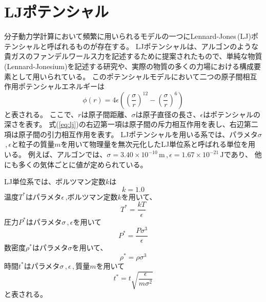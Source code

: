 \documentclass[titlepage]{jsreport}
\begin{document}
\section{LJポテンシャル}\label{principle-sec:LJ}
分子動力学計算において頻繁に用いられるモデルの一つにLennard-Jones\,(LJ)ポテンシャルと呼ばれるものが存在する。
LJポテンシャルは、アルゴンのような貴ガスのファンデルワールス力を記述するために提案された\cite{lennard-jones}もので、単純な物質(Lennard-Jonesium)を記述する研究\cite{lennard-jonesium-1,lennard-jonesium-2}や、実際の物質の多くの力場における構成要素\cite{lennard-jones-force-field-1,lennard-jones-force-field-2, lennard-jones-force-field-3}として用いられている。
このポテンシャルモデルにおいて二つの原子間相互作用ポテンシャルエネルギーは
\large
\begin{equation}
\phi(r)=4{\epsilon}\left(\left(\frac{\sigma}{r}\right)^{12}-\left(\frac{\sigma}{r}\right)^6\right)\label{eq:lj}
\end{equation}
\normalsize
と表される。
ここで、$r$は原子間距離、${\sigma}$は原子直径の長さ、${\epsilon}$はポテンシャルの深さを表す。
式(\ref{eq:lj})の右辺第一項は原子間の斥力相互作用を表し、右辺第二項は原子間の引力相互作用を表す。
LJポテンシャルを用いる系では、パラメタ$\sigma$\,,\,$\epsilon$と粒子の質量$m$を用いて物理量を無次元化したLJ単位系と呼ばれる単位を用いる。
例えば、アルゴンでは、${\sigma}=3.40×10^{-10}\,\mathrm{m}$\,,\,${\epsilon}=1.67×10^{-21}\,\mathrm{J}$であり\cite{lennard-jones-argon-parameters}、
他にも多くの気体ごとに値が定められている\cite{lennard-jones-many-parameters}。

LJ単位系では、ボルツマン定数$k$は
\large
\begin{equation}
k=1.0\label{eq:k}
\end{equation}
\normalsize
温度$T^*$はパラメタ$\epsilon$\,,ボルツマン定数$k$を用いて、
\large
\begin{equation}
T^*=\frac{kT}{\epsilon}\label{eq:T}
\end{equation}
\normalsize
圧力$P^*$はパラメタ${\sigma}$\,,\,${\epsilon}$を用いて
\large
\begin{equation}
P^*=\frac{P\sigma^3}{\epsilon}\label{eq:P}
\end{equation}
\normalsize
数密度$\rho^*$はパラメタ$\sigma$を用いて、
\large
\begin{equation}
\rho^*=\rho{\sigma}^3\label{eq:rho}
\end{equation}
\normalsize
時間$t^*$はパラメタ${\sigma}$\,,\,${\epsilon}$\,,\,質量$m$を用いて
\large
\begin{equation}
t^*=t\sqrt{\frac{\epsilon}{m{\sigma}^2}}\label{eq:time}
\end{equation}
\normalsize
と表される。
\end{document}
